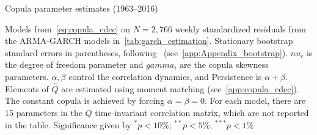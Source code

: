 
\begin{table}[p]
  \centering
  \footnotesize
  \renewcommand{\arraystretch}{1.2}

  \caption{Copula parameter estimates (1963--2016)}

  \begin{longcaption}
    Models from~\autoref{eq:copula_cdcc} on $N = 2,766$ weekly standardized residuals from the ARMA-GARCH models in~\autoref{tab:garch_estimation}. Stationary bootstrap standard errors in parentheses, following~\autocite{PolitisRomano1994} (see~\autoref{app:Appendix_bootstrap}). $nu_c$ is the degree of freedom parameter and $gamma_i$ are the copula skewness parameters. $\alpha, \beta$ control the correlation dynamics, and Persistence is $\alpha + \beta$. Elements of $\hat{Q}$ are estimated using moment matching (see~\autoref{app:copula_cdcc}). The constant copula is achieved by forcing $\alpha = \beta = 0$. For each model, there are 15 parameters in the $Q$ time-invariant correlation matrix, which are not reported in the table. Significance given by $^{*}p<10\%$; $^{**}p<5\%$; $^{***}p<1\%$
  \end{longcaption}


\end{table}
